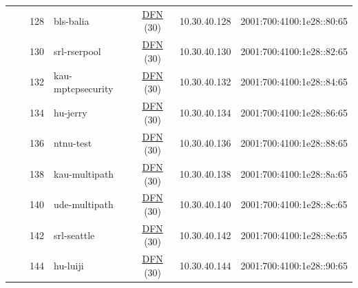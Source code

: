 \begin{small}
\begin{center}
\begin{longtable}{|c|c|c|c|c|c|c|c|}
  &  & \tiny{128} & \multicolumn{1}{|l|}{\tiny{bls-balia}} & \multicolumn{2}{|c|}{\tiny{\href{https://www.dfn.de}{DFN} (30)}} & \tiny{10.30.40.128} & \tiny{2001:700:4100:1e28::80:65} \\* \cline{3-3}\cline{4-4}\cline{5-5}\cline{6-6}\cline{7-7}\cline{8-8}
  &  & \tiny{130} & \multicolumn{1}{|l|}{\tiny{srl-rserpool}} & \multicolumn{2}{|c|}{\tiny{\href{https://www.dfn.de}{DFN} (30)}} & \tiny{10.30.40.130} & \tiny{2001:700:4100:1e28::82:65} \\* \cline{3-3}\cline{4-4}\cline{5-5}\cline{6-6}\cline{7-7}\cline{8-8}
  &  & \tiny{132} & \multicolumn{1}{|l|}{\tiny{kau-mptcpsecurity}} & \multicolumn{2}{|c|}{\tiny{\href{https://www.dfn.de}{DFN} (30)}} & \tiny{10.30.40.132} & \tiny{2001:700:4100:1e28::84:65} \\* \cline{3-3}\cline{4-4}\cline{5-5}\cline{6-6}\cline{7-7}\cline{8-8}
  &  & \tiny{134} & \multicolumn{1}{|l|}{\tiny{hu-jerry}} & \multicolumn{2}{|c|}{\tiny{\href{https://www.dfn.de}{DFN} (30)}} & \tiny{10.30.40.134} & \tiny{2001:700:4100:1e28::86:65} \\* \cline{3-3}\cline{4-4}\cline{5-5}\cline{6-6}\cline{7-7}\cline{8-8}
  &  & \tiny{136} & \multicolumn{1}{|l|}{\tiny{ntnu-test}} & \multicolumn{2}{|c|}{\tiny{\href{https://www.dfn.de}{DFN} (30)}} & \tiny{10.30.40.136} & \tiny{2001:700:4100:1e28::88:65} \\* \cline{3-3}\cline{4-4}\cline{5-5}\cline{6-6}\cline{7-7}\cline{8-8}
  &  & \tiny{138} & \multicolumn{1}{|l|}{\tiny{kau-multipath}} & \multicolumn{2}{|c|}{\tiny{\href{https://www.dfn.de}{DFN} (30)}} & \tiny{10.30.40.138} & \tiny{2001:700:4100:1e28::8a:65} \\* \cline{3-3}\cline{4-4}\cline{5-5}\cline{6-6}\cline{7-7}\cline{8-8}
  &  & \tiny{140} & \multicolumn{1}{|l|}{\tiny{ude-multipath}} & \multicolumn{2}{|c|}{\tiny{\href{https://www.dfn.de}{DFN} (30)}} & \tiny{10.30.40.140} & \tiny{2001:700:4100:1e28::8c:65} \\* \cline{3-3}\cline{4-4}\cline{5-5}\cline{6-6}\cline{7-7}\cline{8-8}
  &  & \tiny{142} & \multicolumn{1}{|l|}{\tiny{srl-seattle}} & \multicolumn{2}{|c|}{\tiny{\href{https://www.dfn.de}{DFN} (30)}} & \tiny{10.30.40.142} & \tiny{2001:700:4100:1e28::8e:65} \\* \cline{3-3}\cline{4-4}\cline{5-5}\cline{6-6}\cline{7-7}\cline{8-8}
  &  & \tiny{144} & \multicolumn{1}{|l|}{\tiny{hu-luiji}} & \multicolumn{2}{|c|}{\tiny{\href{https://www.dfn.de}{DFN} (30)}} & \tiny{10.30.40.144} & \tiny{2001:700:4100:1e28::90:65} \\* \cline{3-3}\cline{4-4}\cline{5-5}\cline{6-6}\cline{7-7}\cline{8-8}

\end{longtable}
\end{center}
\end{small}

